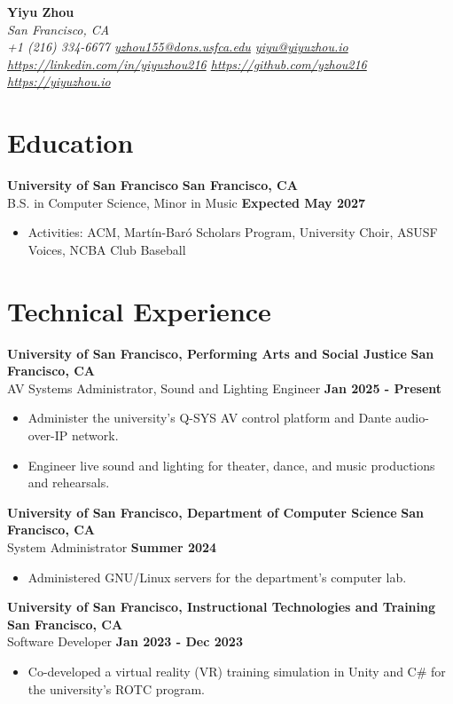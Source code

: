\documentclass[letterpaper]{article}
\newenvironment{entry}[4]{%
  \textbf{#1} \hfill \textbf{#2} \\
  #3 \hfill \textbf{#4}
  \begin{itemize}
}{%
  \end{itemize}
  \medskip
}
\begin{document}
\begin{center}
  {\Large\bfseries Yiyu Zhou} \\[\smallskipamount]
  \itshape
  San Francisco, CA \\
  +1 (216) 334-6677 \textbar{}
  \href{mailto:yzhou155@dons.usfca.edu}{yzhou155@dons.usfca.edu} \textbar{}
  \href{mailto:yiyu@yiyuzhou.io}{yiyu@yiyuzhou.io} \\
  \url{https://linkedin.com/in/yiyuzhou216} \textbar{}
  \url{https://github.com/yzhou216} \textbar{}
  \url{https://yiyuzhou.io}
\end{center}

\section*{Education}

\begin{entry}{University of San Francisco}{San Francisco, CA}
  {B.S. in Computer Science, Minor in Music}{Expected May 2027}
  \item Activities: ACM, Martín-Baró Scholars Program, University Choir,
    ASUSF Voices, NCBA Club Baseball
\end{entry}

\section*{Technical Experience}

\begin{entry}{University of San Francisco, Performing Arts and Social Justice}
  {San Francisco, CA}
  {AV Systems Administrator, Sound and Lighting Engineer}{Jan 2025 - Present}
  \item Administer the university's Q-SYS AV control platform and Dante
    audio-over-IP network.
  \item Engineer live sound and lighting for theater, dance, and music
    productions and rehearsals.
\end{entry}

\begin{entry}{University of San Francisco, Department of Computer Science}
  {San Francisco, CA}
  {System Administrator}{Summer 2024}
  \item Administered GNU/Linux servers for the department's computer lab.
\end{entry}

\begin{entry}{University of San Francisco, Instructional Technologies and Training}
  {San Francisco, CA}
  {Software Developer}{Jan 2023 - Dec 2023}
  \item Co-developed a virtual reality (VR) training simulation in Unity and
    C\# for the university's ROTC program.
\end{entry}
\end{document}

